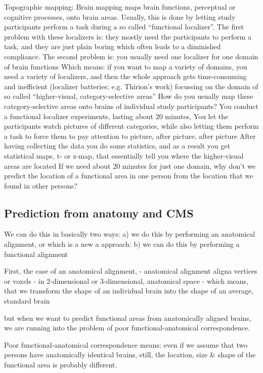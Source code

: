 %
Topographic mapping:
%
Brain mapping maps brain functions, perceptual or cognitive processes, onto
brain areas.
%
Usually, this is done by letting study participants perform a task during a so
called ``functional localizer''.
%
The first problem with these localizers is: they mostly need the participants
to perform a task, and they are just plain boring which often leads to a
diminished compliance.
%
The second problem is: you usually need one localizer for one domain of brain
functions
%
Which means: if you want to map a variety of domains, you need a variety of
localizers, and then the whole approach gets time-consuming and inefficient
(localizer batteries; e.g. Thirion's work)
%
focussing on the domain of so called ``higher-visual, category-selective
areas''
%
How do you usually map these category-selective areas onto brains of individual
study participants?
%
You conduct a functional localizer experiments, lasting about 20 minutes,
%
You let the participants watch pictures of different categories, while also
letting them perform a task to force them to pay attention to picture, after
picture, after picture
%
After having collecting the data you do some statistics, and as a result you
get statistical maps, t- or z-map, that essentially tell you where the
higher-visual areas are located
%
If we need about 20 minutes for just one domain, why don’t we predict the
location of a functional area in one person from the location that we found in
other persons?



\subsection{Prediction from anatomy and CMS}

We can do this in basically two ways:
a) we do this by performing an anatomical alignment,
or
which is a new a approach:
b) we can do this by performing a functional alignment

First, the case of an anatomical alignment,
- anatomical alignment aligna vertices or voxels
- in 2-dimensional or 3-dimensional, anatomical space
- which means, that we transform the shape of an individual brain
  into the shape of an average, standard brain

but when we want to predict functional areas from anatomically aligned brains,
we are running into the problem of poor
functional-anatomical correspondence.

Poor functional-anatomical correspondence means:
even if we assume that two persons have anatomically identical brains, still,
the location, size \& shape of the functional area is probably different.

